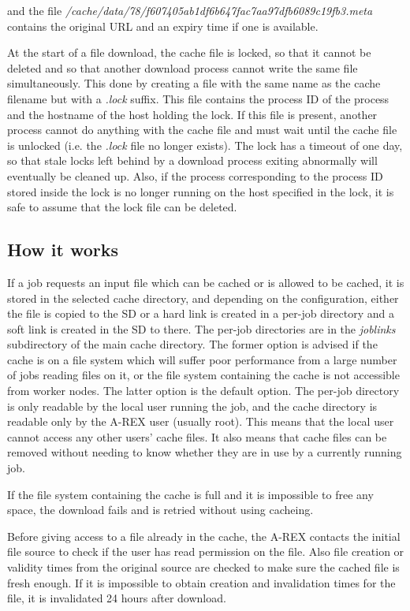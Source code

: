 \documentclass{article}                            %
\begin{document}
and the file \emph{/cache/data/78/f607405ab1df6b647fac7aa97dfb6089c19fb3.meta
}contains the original URL and an expiry time if one is available.

At the start of a file download, the cache file is locked, so that
it cannot be deleted and so that another download process cannot write
the same file simultaneously. This done by creating a file with the
same name as the cache filename but with a \emph{.lock} suffix. This
file contains the process ID of the process and the hostname of the
host holding the lock. If this file is present, another process cannot
do anything with the cache file and must wait until the cache file
is unlocked (i.e. the \emph{.lock} file no longer exists). The lock
has a timeout of one day, so that stale locks left behind by a download
process exiting abnormally will eventually be cleaned up. Also, if
the process corresponding to the process ID stored inside the lock
is no longer running on the host specified in the lock, it is safe
to assume that the lock file can be deleted.


\subsection{How it works}

If a job requests an input file which can be cached or is allowed to
be cached, it is stored in the selected cache directory, and depending
on the configuration, either the file is copied to the SD or a hard
link is created in a per-job directory and a soft link is created in
the SD to there. The per-job directories are in the \emph{joblinks}
subdirectory of the main cache directory. The former option is advised
if the cache is on a file system which will suffer poor performance
from a large number of jobs reading files on it, or the file system
containing the cache is not accessible from worker nodes. The latter
option is the default option. The per-job directory is only readable
by the local user running the job, and the cache directory is readable
only by the A-REX user (usually root). This means that the local user
cannot access any other users' cache files. It also means that cache
files can be removed without needing to know whether they are in use
by a currently running job.

If the file system containing the cache is full and it is impossible
to free any space, the download fails and is retried without using
cacheing.

Before giving access to a file already in the cache, the A-REX contacts
the initial file source to check if the user has read permission on
the file. Also file creation or validity times from the original source
are checked to make sure the cached file is fresh enough. If it is
impossible to obtain creation and invalidation times for the file,
it is invalidated 24 hours after download.
\end{document}
